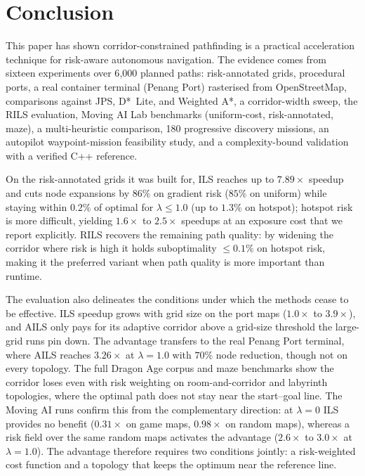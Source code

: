 \documentclass[preprint,12pt,authoryear]{elsarticle}
\begin{document}
\section{Conclusion}\label{sec:conclusion}

This paper has shown corridor-constrained pathfinding is a practical acceleration technique for risk-aware autonomous navigation. The evidence comes from sixteen experiments over 6{,}000 planned paths: risk-annotated grids, procedural ports, a real container terminal (Penang Port) rasterised from OpenStreetMap, comparisons against JPS, D*~Lite, and Weighted A*, a corridor-width sweep, the RILS evaluation, Moving AI Lab benchmarks (uniform-cost, risk-annotated, maze), a multi-heuristic comparison, 180 progressive discovery missions, an autopilot waypoint-mission feasibility study, and a complexity-bound validation with a verified C++ reference.

On the risk-annotated grids it was built for, ILS reaches up to $7.89\times$ speedup and cuts node expansions by $86\%$ on gradient risk ($85\%$ on uniform) while staying within $0.2\%$ of optimal for $\lambda \leq 1.0$ (up to $1.3\%$ on hotspot); hotspot risk is more difficult, yielding $1.6\times$ to $2.5\times$ speedups at an exposure cost that we report explicitly. RILS recovers the remaining path quality: by widening the corridor where risk is high it holds suboptimality $\leq 0.1\%$ on hotspot risk, making it the preferred variant when path quality is more important than runtime.

The evaluation also delineates the conditions under which the methods cease to be effective. ILS speedup grows with grid size on the port maps ($1.0\times$ to $3.9\times$), and AILS only pays for its adaptive corridor above a grid-size threshold the large-grid runs pin down. The advantage transfers to the real Penang Port terminal, where AILS reaches $3.26\times$ at $\lambda = 1.0$ with $70\%$ node reduction, though not on every topology. The full Dragon Age corpus and maze benchmarks show the corridor loses even with risk weighting on room-and-corridor and labyrinth topologies, where the optimal path does not stay near the start--goal line. The Moving AI runs confirm this from the complementary direction: at $\lambda = 0$ ILS provides no benefit ($0.31\times$ on game maps, $0.98\times$ on random maps), whereas a risk field over the same random maps activates the advantage ($2.6\times$ to $3.0\times$ at $\lambda = 1.0$). The advantage therefore requires two conditions jointly: a risk-weighted cost function and a topology that keeps the optimum near the reference line.
\end{document}
